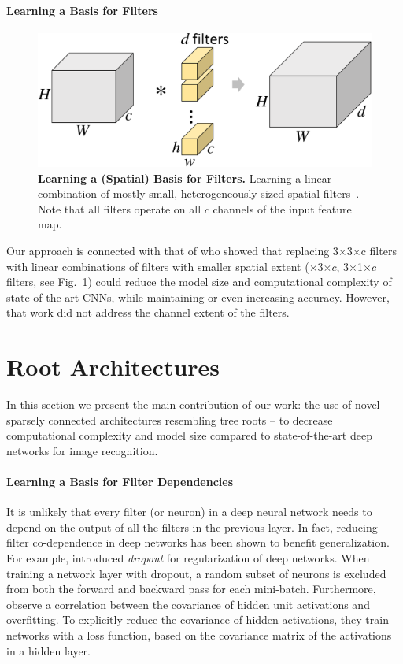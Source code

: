 \documentclass[thesis]{subfiles}
\begin{document}
	\paragraph{Learning a Basis for Filters}
	\begin{figure}[tp]
		\centering
		\includegraphics[width=\linewidth, page=3]{Figs/PDF/sparsification}
		\caption{\textbf{Learning a (Spatial) Basis for Filters.} Learning a linear combination of mostly small, heterogeneously sized spatial filters~\citep{Ioannou2016}. Note that all filters operate on all $c$ channels of the input feature map.}
		\label{fig:spatialbasis}
	\end{figure}
	Our approach is connected with that of \citet{Ioannou2016} who showed that replacing 3$\times$3$\times$c filters with linear combinations of filters with smaller spatial extent ($\times$3$\times c$, 3$\times$1$\times c$ filters, see Fig.~\ref{fig:spatialbasis}) could reduce the model size and computational complexity of state-of-the-art CNNs, while maintaining or even increasing accuracy. However, that work did not address the channel extent of the filters.
	
	\section{Root Architectures}
	\label{method}
	In this section we present the main contribution of our work: the use of novel sparsely connected architectures resembling tree roots -- to decrease computational complexity and model size compared to state-of-the-art deep networks for image recognition.
	
	\paragraph{Learning a Basis for Filter Dependencies}
	It is unlikely that every filter (or neuron) in a deep neural network needs to depend on the output of all the filters in the previous layer. In fact, reducing filter co-dependence in deep networks has been shown to benefit generalization. For example, \citet{Hinton2012} introduced {\em dropout} for regularization of deep networks. When training a network layer with dropout, a random subset of neurons is excluded from both the forward and backward pass for each mini-batch.  Furthermore, \citet{Cogswell2016} observe a correlation between the covariance of hidden unit activations and overfitting. To explicitly reduce the covariance of hidden activations, they train networks with a loss function, based on the covariance matrix of the activations in a hidden layer. 
	
\end{document}
